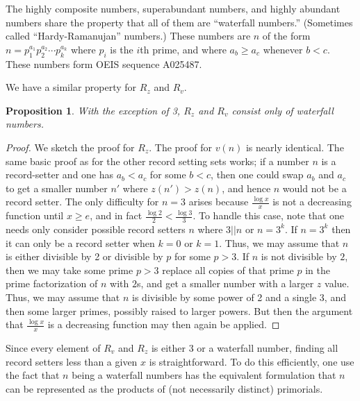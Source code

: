 \documentclass{article}
\newtheorem{proposition}[theorem]{Proposition}
\begin{document}
The highly composite numbers, superabundant numbers, and highly abundant numbers share the property that all of them are ``waterfall numbers.'' (Sometimes called ``Hardy-Ramanujan'' numbers.)  These numbers are $n$ of the form $n=p_1^{a_1}p_2^{a_2}\cdots p_k^{a_k}$ where $p_i$ is the $i$th prime, and where $a_{b} \geq a_c$ whenever $b < c$. These numbers form OEIS sequence A025487.\cite{OEIS A025487}

We have a similar property for $R_z$ and $R_v$. 

\begin{proposition} With the exception of 3, $R_z$ and $R_v$ consist only of waterfall numbers.
\end{proposition}
\begin{proof}
We sketch the proof for $R_z$. The proof for $v(n)$ is nearly identical. The same basic proof as for the other record setting sets works; if a number $n$ is a record-setter and one has $a_{b} < a_c$ for some $b < c$, then one could swap $a_b$ and $a_c$ to get a smaller number $n'$ where $z(n') > z(n)$, and hence $n$ would not be a record setter. The only difficulty for $n=3$ arises because $\frac{\log x}{x}$ is not a decreasing function until $x \geq e$, and in fact $\frac{\log 2}{2} < \frac{\log 3}{3}$. To handle this case, note that one needs only consider possible record setters $n$  where $3||n$ or $n=3^k$.  If $n=3^k$ then it can only be a record setter when $k=0$ or $k=1$. Thus, we may assume that $n$ is either divisible by 2 or divisible by $p$ for some $p>3$. If $n$ is not divisible by $2$, then we may  take some prime $p >3 $ replace all copies of that prime $p$ in the prime factorization of $n$ with $2$s, and get a smaller number with a larger $z$ value. Thus, we may assume that $n$ is divisible by some power of 2 and a single 3, and then some larger primes, possibly raised to larger powers. But then the argument that $\frac{\log x}{x}$  is a decreasing function may then again be applied. 
\end{proof}

Since every element of $R_v$ and $R_z$ is either 3 or a waterfall number, finding all record setters less than a given $x$ is straightforward. To do this efficiently, one use the fact that $n$ being a waterfall numbers has the equivalent formulation that $n$ can be represented as the products of (not necessarily distinct) primorials. 

\end{document}
